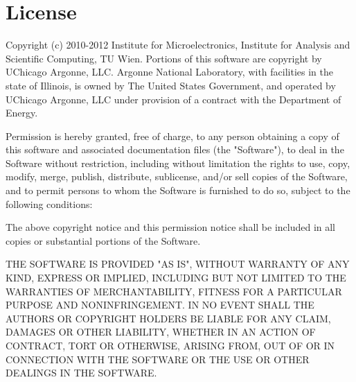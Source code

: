 
\chapter*{License}  

Copyright (c) 2010-2012 Institute for Microelectronics, Institute for Analysis and Scientific Computing, TU Wien.
Portions of this software are copyright by UChicago Argonne, LLC.
Argonne National Laboratory, with facilities in the state of Illinois,
is owned by The United States Government, and operated by UChicago Argonne, LLC
under provision of a contract with the Department of Energy.

Permission is hereby granted, free of charge, to any person obtaining a copy
of this software and associated documentation files (the "Software"), to deal
in the Software without restriction, including without limitation the rights
to use, copy, modify, merge, publish, distribute, sublicense, and/or sell
copies of the Software, and to permit persons to whom the Software is
furnished to do so, subject to the following conditions:

The above copyright notice and this permission notice shall be included in
all copies or substantial portions of the Software.

THE SOFTWARE IS PROVIDED "AS IS", WITHOUT WARRANTY OF ANY KIND, EXPRESS OR
IMPLIED, INCLUDING BUT NOT LIMITED TO THE WARRANTIES OF MERCHANTABILITY,
FITNESS FOR A PARTICULAR PURPOSE AND NONINFRINGEMENT. IN NO EVENT SHALL THE
AUTHORS OR COPYRIGHT HOLDERS BE LIABLE FOR ANY CLAIM, DAMAGES OR OTHER
LIABILITY, WHETHER IN AN ACTION OF CONTRACT, TORT OR OTHERWISE, ARISING FROM,
OUT OF OR IN CONNECTION WITH THE SOFTWARE OR THE USE OR OTHER DEALINGS IN
THE SOFTWARE.